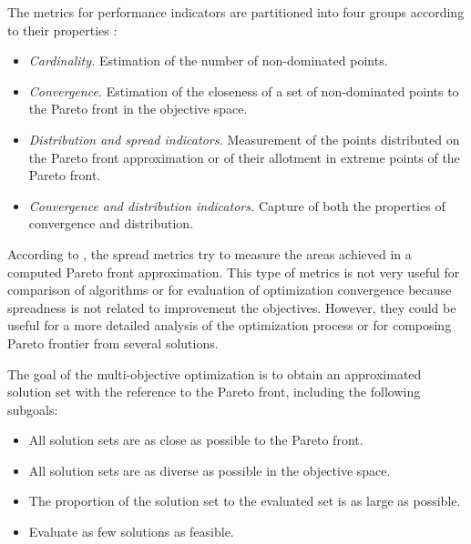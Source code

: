             The metrics for performance indicators are partitioned into four groups according to their properties \cite{Audet2018PerformanceII}: 
            \begin{itemize}
                \item \textit{Cardinality.} Estimation of the number of non-dominated points.
                \item \textit{Convergence.} Estimation of the closeness of a set of non-dominated points to the Pareto front in the objective space.
                \item \textit{Distribution and spread indicators.}  Measurement of the points distributed on the Pareto front approximation or of their allotment in extreme points of the Pareto front.
                \item \textit{Convergence and distribution indicators.} Capture of both the properties of convergence and distribution.
            \end{itemize}

            According to \cite{CustodioMVV11}, the spread metrics try to measure the areas achieved in a computed Pareto front approximation. This type of metrics is not very useful for comparison of algorithms or for evaluation of optimization convergence because spreadness is not related to improvement the objectives. However, they could be useful for a more detailed analysis of the optimization process or for composing Pareto frontier from several solutions.

            The goal of the multi-objective optimization is to obtain an approximated solution set with the reference to the Pareto front, including the following subgoals:
            \begin{itemize}
                \item All solution sets are as close as possible to the Pareto front.
                \item All solution sets are as diverse as possible in the objective space.
                \item The proportion of the solution set to the evaluated set is as large as possible. 
                \item Evaluate as few solutions as feasible.
            \end{itemize}

